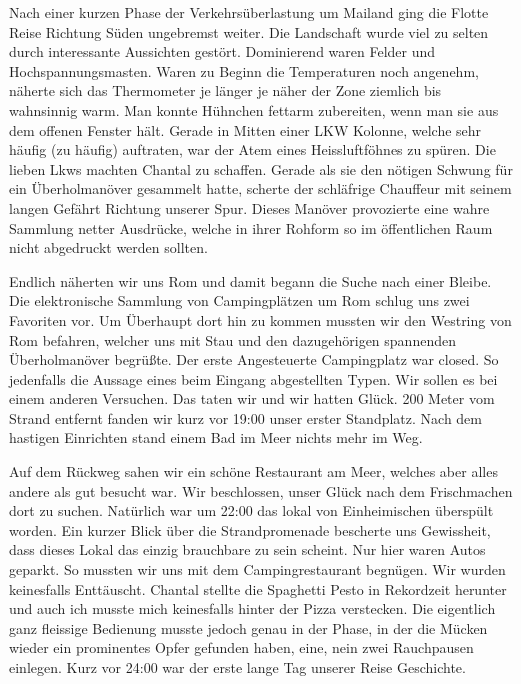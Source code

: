Nach einer kurzen Phase der Verkehrsüberlastung um Mailand ging die Flotte Reise Richtung Süden ungebremst weiter.
Die Landschaft wurde viel zu selten durch interessante Aussichten gestört.
Dominierend waren Felder und Hochspannungsmasten.
Waren zu Beginn die Temperaturen noch angenehm, näherte sich das Thermometer je länger je näher der Zone ziemlich bis wahnsinnig warm.
Man konnte Hühnchen fettarm zubereiten, wenn man sie aus dem offenen Fenster hält.
Gerade in Mitten einer LKW Kolonne, welche sehr häufig (zu häufig) auftraten, war der Atem eines Heissluftföhnes zu spüren.
Die lieben Lkws machten Chantal zu schaffen.
Gerade als sie den nötigen Schwung für ein Überholmanöver gesammelt hatte, scherte der schläfrige Chauffeur mit seinem langen Gefährt Richtung unserer Spur.
Dieses Manöver provozierte eine wahre Sammlung netter Ausdrücke, welche in ihrer Rohform so im öffentlichen Raum nicht abgedruckt werden sollten.

Endlich näherten wir uns Rom und damit begann die Suche nach einer Bleibe.
Die elektronische Sammlung von Campingplätzen um Rom schlug uns zwei Favoriten vor.
Um Überhaupt dort hin zu kommen mussten wir den Westring von Rom befahren, welcher uns mit Stau und den dazugehörigen spannenden Überholmanöver begrüßte.
Der erste Angesteuerte Campingplatz war closed.
So jedenfalls die Aussage eines beim Eingang abgestellten Typen.
Wir sollen es bei einem anderen Versuchen.
Das taten wir und wir hatten Glück.
200 Meter vom Strand entfernt fanden wir kurz vor 19:00 unser erster Standplatz.
Nach dem hastigen Einrichten stand einem Bad im Meer nichts mehr im Weg.

Auf dem Rückweg sahen wir ein schöne Restaurant am Meer, welches aber alles andere als gut besucht war.
Wir beschlossen, unser Glück nach dem Frischmachen dort zu suchen.
Natürlich war um 22:00 das lokal von Einheimischen überspült worden.
Ein kurzer Blick über die Strandpromenade bescherte uns Gewissheit, dass dieses Lokal das einzig brauchbare zu sein scheint.
Nur hier waren Autos geparkt.
So mussten wir uns mit dem Campingrestaurant begnügen.
Wir wurden keinesfalls Enttäuscht.
Chantal stellte die Spaghetti Pesto in Rekordzeit herunter und auch ich musste mich keinesfalls hinter der Pizza verstecken.
Die eigentlich ganz fleissige Bedienung musste jedoch genau in der Phase, in der die Mücken wieder ein prominentes Opfer gefunden haben, eine, nein zwei Rauchpausen einlegen.
Kurz vor 24:00 war der erste lange Tag unserer Reise Geschichte.

